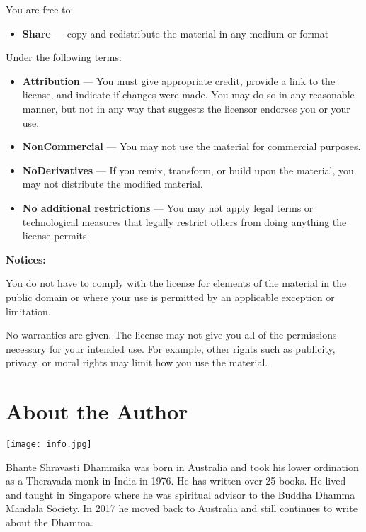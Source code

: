 \label{footprints_split_026.html_ccDetail}
You are free to:

\begin{itemize}
\tightlist
\item
  \textbf{Share} --- copy and redistribute the material in any medium or
  format
\end{itemize}

Under the following terms:

\begin{itemize}
\tightlist
\item
  \textbf{Attribution} --- You must give appropriate credit, provide a
  link to the license, and indicate if changes were made. You may do so
  in any reasonable manner, but not in any way that suggests the
  licensor endorses you or your use.
\item
  \textbf{NonCommercial} --- You may not use the material for commercial
  purposes.
\item
  \textbf{NoDerivatives} --- If you remix, transform, or build upon the
  material, you may not distribute the modified material.
\item
  \textbf{No additional restrictions} --- You may not apply legal terms
  or technological measures that legally restrict others from doing
  anything the license permits.
\end{itemize}

\textbf{Notices:}

You do not have to comply with the license for elements of the material
in the public domain or where your use is permitted by an applicable
exception or limitation.

No warranties are given. The license may not give you all of the
permissions necessary for your intended use. For example, other rights
such as publicity, privacy, or moral rights may limit how you use the
material.

\label{footprints_split_026.html_calibre_pb_51}

\label{footprints_split_027.html}{}

\section{About the
Author}\label{footprints_split_027.html_calibre_toc_28}

\texttt{[image: info.jpg]}

Bhante Shravasti Dhammika was born in Australia and took his lower
ordination as a Theravada monk in India in 1976. He has written over 25
books. He lived and taught in Singapore where he was spiritual advisor
to the Buddha Dhamma Mandala Society. In 2017 he moved back to Australia
and still continues to write about the Dhamma.
